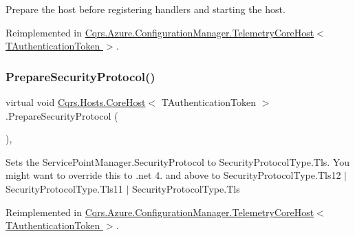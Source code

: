 Prepare the host before registering handlers and starting the host. 



Reimplemented in \hyperlink{classCqrs_1_1Azure_1_1ConfigurationManager_1_1TelemetryCoreHost_a620cb9c1ceb78a8f23b45ae749199fd4_a620cb9c1ceb78a8f23b45ae749199fd4}{Cqrs.\+Azure.\+Configuration\+Manager.\+Telemetry\+Core\+Host$<$ T\+Authentication\+Token $>$}.

\mbox{\label{classCqrs_1_1Hosts_1_1CoreHost_a220ba43ac810c074c8881e8f598ff746_a220ba43ac810c074c8881e8f598ff746}} 
\subsubsection{\texorpdfstring{Prepare\+Security\+Protocol()}{PrepareSecurityProtocol()}}
{\footnotesize\ttfamily virtual void \hyperlink{classCqrs_1_1Hosts_1_1CoreHost}{Cqrs.\+Hosts.\+Core\+Host}$<$ T\+Authentication\+Token $>$.Prepare\+Security\+Protocol (\begin{DoxyParamCaption}{ }\end{DoxyParamCaption})\hspace{0.3cm}{\ttfamily [protected]}, {\ttfamily [virtual]}}



Sets the Service\+Point\+Manager.\+Security\+Protocol to Security\+Protocol\+Type.\+Tls. You might want to override this to .net 4. and above to Security\+Protocol\+Type.\+Tls12 $\vert$ Security\+Protocol\+Type.\+Tls11 $\vert$ Security\+Protocol\+Type.\+Tls 



Reimplemented in \hyperlink{classCqrs_1_1Azure_1_1ConfigurationManager_1_1TelemetryCoreHost_a0e920d0139b12319847f8ec1deb12f3b_a0e920d0139b12319847f8ec1deb12f3b}{Cqrs.\+Azure.\+Configuration\+Manager.\+Telemetry\+Core\+Host$<$ T\+Authentication\+Token $>$}.

\mbox{\label{classCqrs_1_1Hosts_1_1CoreHost_a118553f5aa11e7fe07fce1d899528fa6_a118553f5aa11e7fe07fce1d899528fa6}} 
